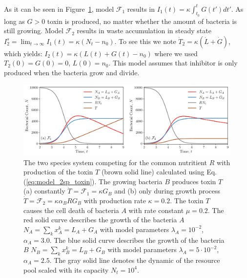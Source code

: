 \documentclass[10pt,A4paper]{article}
\begin{document}
As it can be seen in Figure~\ref{fig:2pool_2sp_toxin}, model $\mathcal{F}_1$ results in $I_1(t)=\kappa\int_{t_0}^tG(t')dt'$. 
As long as $G>0$ toxin is produced, no matter whether the amount of bacteria is still growing. 
Model $\mathcal{F}_2$ results in waste accumulation in steady state $I_2^s=\lim_{t\to\infty}I_1(t)=\kappa(N_t-n_0)$. 
To see this we note $\dot{T}_2=\kappa(\dot{L}+\dot{G})$, which yields: $I_2(t)=\kappa(L(t)+G(t)-n_0)$ where we used $T_2(0)=G(0)=0$, $L(0)=n_0$. 
This model assumes that inhibitor is only produced when the bacteria grow and divide. \\

\begin{figure}[H]
    \begin{center}
    \includegraphics[width=1.\textwidth]{Figures/pool_model_2pools_toxin.pdf}
    \caption{{\footnotesize The two species system competing for the common nutritient $R$ with production of the toxin $T$ (brown solid line) calculated using Eq. (\ref{eq:model_2sp_toxin}).
    The growing bacteria $B$ produces toxin $T$ (a) constantly $\dot{T} = \mathcal{F}_1 = \kappa G_B$ and (b) only during growth process $\dot{T} = \mathcal{F}_2 = \kappa \alpha_B R G_B$ with 
    production rate $\kappa=0.2$.
    The toxin $T$ causes the cell death of bacteria $A$ with rate constant $\mu = 0.2$.
    The red solid curve describes the growth of the bacteria $A$ $N_A = \sum_{k} x_A^k = L_A+G_A$ with model parameters $\lambda_A=10^{-2}$, $\alpha_A=3.0$.
    The blue solid curve describes the growth of the bacteria $B$ $N_B = \sum_{k} x_B^k = L_B+G_B$ with model parameters $\lambda_A=5\cdot 10^{-2}$, $\alpha_A=2.5$.
    The gray solid line denotes the dynamic of the resource pool scaled with its capacity $N_t=10^4$.}}
    \label{fig:2pool_2sp_toxin}
    \end{center}
\end{figure}
\end{document}
